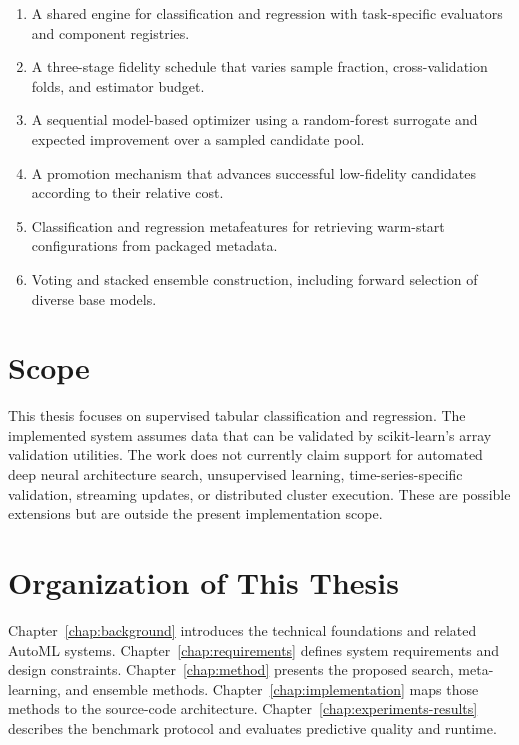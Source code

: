 \documentclass[12pt,a4paper,oneside]{report}
\begin{document}
\begin{enumerate}[leftmargin=*]
  \item A shared engine for classification and regression with task-specific
        evaluators and component registries.
  \item A three-stage fidelity schedule that varies sample fraction,
        cross-validation folds, and estimator budget.
  \item A sequential model-based optimizer using a random-forest surrogate and
        expected improvement over a sampled candidate pool.
  \item A promotion mechanism that advances successful low-fidelity candidates
        according to their relative cost.
  \item Classification and regression metafeatures for retrieving warm-start
        configurations from packaged metadata.
  \item Voting and stacked ensemble construction, including forward selection
        of diverse base models.
\end{enumerate}

\section{Scope}

This thesis focuses on supervised tabular classification and regression. The
implemented system assumes data that can be validated by scikit-learn's array
validation utilities. The work does not currently claim support for automated
deep neural architecture search, unsupervised learning, time-series-specific
validation, streaming updates, or distributed cluster execution. These are
possible extensions but are outside the present implementation scope.

\section{Organization of This Thesis}

Chapter~\ref{chap:background} introduces the technical foundations and related
AutoML systems. Chapter~\ref{chap:requirements} defines system requirements and
design constraints. Chapter~\ref{chap:method} presents the proposed search,
meta-learning, and ensemble methods. Chapter~\ref{chap:implementation} maps
those methods to the source-code architecture. Chapter~\ref{chap:experiments-results}
describes the benchmark protocol and evaluates predictive quality and runtime.
\end{document}
